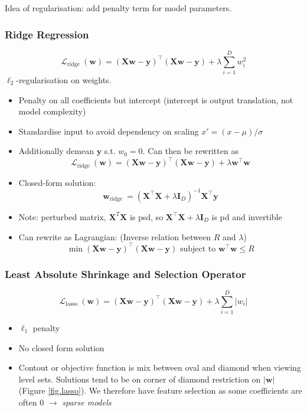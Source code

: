 \documentclass[11pt, %
	oneside, %
	english, %
	onehalfspacing, %
	parskip, %
	]{article} %
\theoremstyle{definition}
\begin{document}
Idea of regularisation: add penalty term for model parameters.

\subsubsection*{Ridge Regression}

\begin{equation*}
	\mathcal{L}_{\text {ridge }}(\mathbf{w})=(\mathbf{X w}-\mathbf{y})^{\top}(\mathbf{X} \mathbf{w}-\mathbf{y})+\lambda \sum_{i=1}^D w_i^2
\end{equation*}
$\ell_2$-regularisation on weights.

\begin{itemize}
	\item Penalty on all coefficients but intercept (intercept is output translation, not model complexity)
	\item Standardise input to avoid dependency on scaling $x' = (x- \mu) / \sigma$
	\item Additionally demean $\mathbf{y}$ s.t. $w_0 = 0$. Can then be rewritten as
	$$\mathcal{L}_{\text {ridge }}(\mathbf{w})=(\mathbf{X w}-\mathbf{y})^{\top}(\mathbf{X} \mathbf{w}-\mathbf{y}) +\lambda \mathbf{w}^{\top} \mathbf{w}$$
	\item Closed-form solution:
	\begin{equation*}
		\mathbf{w}_{\text {ridge }}=\left(\mathbf{X}^{\top} \mathbf{X}+\lambda \mathbf{I}_D\right)^{-1} \mathbf{X}^{\top} \mathbf{y}
	\end{equation*}
	\item Note: perturbed matrix, $\mathbf{X}^T \mathbf{X}$ is psd, so $\mathbf{X}^{\top} \mathbf{X}+\lambda \mathbf{I}_D$ is pd and invertible
	\item Can rewrite as Lagrangian: (Inverse relation between $R$ and $\lambda$)
	\begin{equation*}
		\min (\mathbf{X w}-\mathbf{y})^{\top}(\mathbf{X w}-\mathbf{y})  \text { subject to }  \mathbf{w}^{\top} \mathbf{w} \leq R
	\end{equation*}
\end{itemize}

\subsubsection*{Least Absolute Shrinkage and Selection Operator}

\begin{equation*}
	\mathcal{L}_{\text {lasso }}(\mathbf{w})=(\mathbf{X w}-\mathbf{y})^{\top}(\mathbf{X w}-\mathbf{y})+\lambda \sum_{i=1}^D\left|w_i\right|
\end{equation*}
\begin{itemize}
	\item $\ell_1$ penalty
	\item No closed form solution
	\item Contout or objective function is mix between oval and diamond when viewing level sets. Solutions tend to be on corner of diamond restriction on $|\mathbf{w}|$ (Figure \ref{fig.lasso}). We therefore have feature selection as some coefficients are often $0$ $\to$ \emph{sparse models}
\end{itemize}
\end{document}
